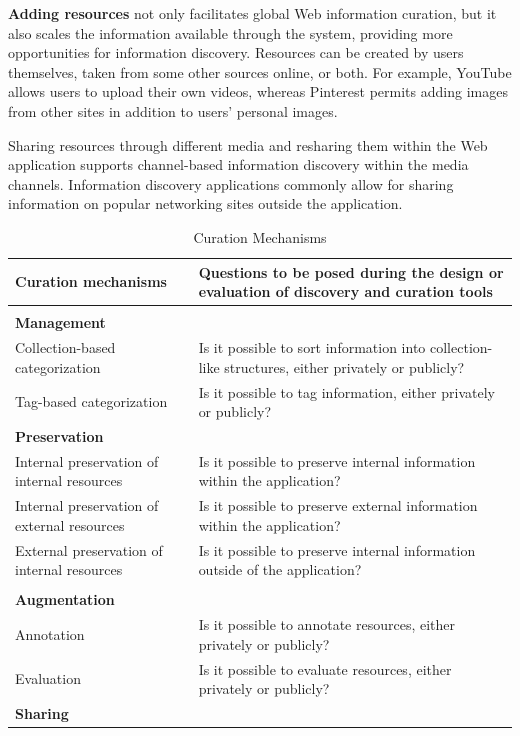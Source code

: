 \documentclass{sigchi}
\begin{document}
{{{{\textbf{Adding resources} not only facilitates global Web information curation, but it also scales the information available through the system, providing more opportunities for information discovery. Resources can be created by users themselves, taken from some other sources online, or both. For example, YouTube allows users to upload their own videos, whereas Pinterest permits adding images from other sites in addition to users' personal images. 

Sharing resources through different media and resharing them within the Web application supports channel-based information discovery within the media channels. Information discovery applications commonly allow for sharing information on popular networking sites outside the application.
} %

\begin{table}[ht!]
\caption{Curation Mechanisms}
\label{table:curation}
\begin{tabular}{|p{}|  p{}|}
\hline
Curation mechanisms  & Questions to be posed during the design or evaluation of  discovery and curation tools  \\
\hline
& \\
\textbf{Management} & \\
Collection-based categorization     & Is it possible to sort information into collection-like structures, either privately or publicly? \\
Tag-based categorization          	& Is it possible to tag information, either privately or publicly? \\
\textbf{Preservation} & \\
Internal preservation of internal resources		& Is it possible to preserve internal information within the application? \\
Internal preservation of external resources     & Is it possible to preserve external information within the application? \\
External preservation of internal resources     & Is it possible to preserve internal information outside of the application? \\ 
& \\
\textbf{Augmentation} & \\
Annotation & Is it possible to annotate resources, either privately or publicly? \\ 
Evaluation & Is it possible to evaluate resources, either privately or publicly? \\       
\textbf{Sharing} & \\

\end{tabular}
\end{table}}}}
\end{document}
